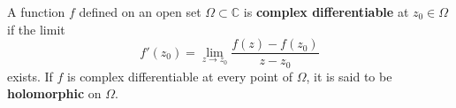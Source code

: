 A function $f$ defined on an open set $\Omega \subset \mathbb{C}$ is \textbf{complex differentiable} at $z_0 \in \Omega$ if the limit
$$f'(z_0) = \lim_{z \to z_0} \frac{f(z) - f(z_0)}{z - z_0}$$
exists. If $f$ is complex differentiable at every point of $\Omega$, it is said to be \textbf{holomorphic} on $\Omega$.
